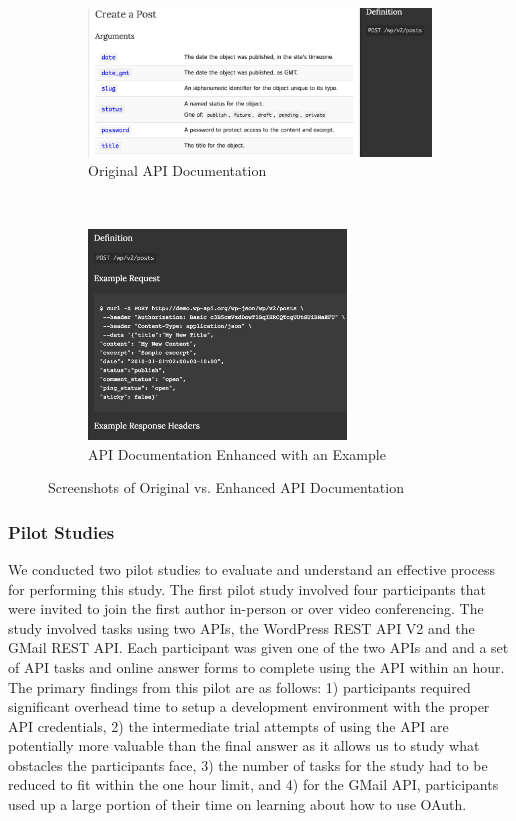 \documentclass[conference]{IEEEtran}
\begin{document}
\begin{figure}[htp]
\centering

\begin{subfigure}[t]{4in}
\centering
\includegraphics[width=4in]{original.png}
\caption{Original API Documentation}
\label{fig:original}
\end{subfigure}
~
\begin{subfigure}[t]{3in}
\centering
\includegraphics[width=2.7in]{forked.png}
\caption{API Documentation Enhanced with an Example}
\label{fig:enhanced}
\end{subfigure}
\caption{Screenshots of Original vs. Enhanced API Documentation}
\end{figure}


\subsubsection{Pilot Studies}

We conducted two pilot studies to evaluate and understand an effective process for performing this study. The first pilot study involved four participants that were invited to join the first author in-person or over video conferencing. The study involved tasks using two APIs, the WordPress REST API V2 and the GMail REST API. Each participant was given one of the two APIs and and a set of API tasks and online answer forms to complete using the API within an hour. The primary findings from this pilot are as follows: 1) participants required significant overhead time to setup a development environment with the proper API credentials, 2) the intermediate trial attempts of using the API are potentially more valuable than the final answer as it allows us to study what obstacles the participants face, 3) the number of tasks for the study had to be reduced to fit within the one hour limit, and 4) for the GMail API, participants used up a large portion of their time on learning about how to use  OAuth.
\end{document}
